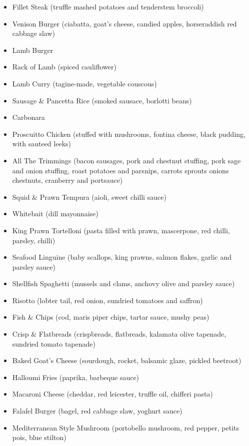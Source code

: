 \documentclass[11pt, english]{article}
\begin{document}
	\begin{itemize}
        \setlength\itemsep{0cm}
                \item Fillet Steak (truffle mashed potatoes and tenderstem broccoli)
		\item Venison Burger (ciabatta, goat's cheese, candied apples, horseraddish red cabbage slaw)
		\item Lamb Burger
		\item Rack of Lamb (spiced cauliflower)
		\item Lamb Curry (tagine-made, vegetable couscous)
		\item Sausage \& Pancetta Rice (smoked sausace, borlotti beans)
		\item Carbonara
		\item Proscuitto Chicken (stuffed with mushrooms, fontina cheese, black pudding, with sauteed leeks)
		\item All The Trimmings (bacon sausages, pork and chestnut stuffing, pork sage and onion stuffing, roast potatoes and parsnips, carrots sprouts onions chestnuts, cranberry and portsauce)
		\item Squid \& Prawn Tempura (aioli, sweet chilli sauce)
		\item Whitebait (dill mayonnaise)
		\item King Prawn Tortelloni (pasta filled with prawn, mascerpone, red chilli, parsley, chilli)
		\item Seafood Linguine (baby scallops, king prawns, salmon flakes, garlic and parsley sauce)
		\item Shellfish Spaghetti (mussels and clams, anchovy olive and parsley sauce)
		\item Risotto (lobter tail, red onion, sundried tomatoes and saffron)
		\item Fish \& Chips (cod, maris piper chips, tartar sauce, mushy peas)
		\item Crisp \& Flatbreads (crispbreads, flatbreads, kalamata olive tapenade, sundried tomato tapenade)
		\item Baked Goat's Cheese (sourdough, rocket, balsamic glaze, pickled beetroot)
		\item Halloumi Fries (paprika, barbeque sauce)
		\item Macaroni Cheese (cheddar, red leicester, truffle oil, chifferi pasta)
		\item Falafel Burger (bagel, red cabbage slaw, yoghurt sauce)
		\item Mediterranean Style Mushroom (portobello mushroom, red pepper, petits pois, blue stilton)

\end{itemize}
\end{document}

